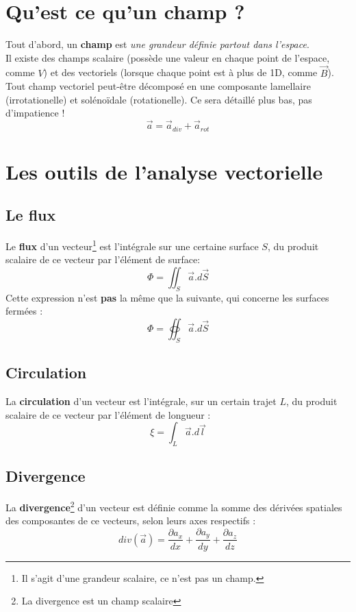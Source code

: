 \documentclass[11pt, a4paper, openany]{book}
\begin{document}
		\section{Qu'est ce qu'un champ ?}
		Tout d'abord, un \textbf{champ} est \textit{une grandeur définie partout dans l'espace}.\\
		Il existe des champs scalaire (possède une valeur en chaque point de l'espace, comme $V$) et des vectoriels (lorsque chaque point est à plus de 1D, comme $\vec{B}$).\\
		Tout champ vectoriel peut-être décomposé en une composante lamellaire (irrotationelle) et solénoïdale (rotationelle). Ce sera détaillé plus bas, pas d'impatience ! 
		\begin{equation}
		\vec{a} = \vec{a}_{div} + \vec{a}_{rot}
		\end{equation}
		
		\section{Les outils de l'analyse vectorielle}
		\subsection{Le flux}
		Le \textbf{flux} d'un vecteur\footnote{Il s'agit d'une grandeur scalaire, ce n'est pas un champ.} est l'intégrale sur une certaine surface $S$, du produit scalaire de ce vecteur par l'élément de surface:
		\begin{equation}
		\Phi = \iint_S \vec{a}.d\vec{S}
		\end{equation}
		Cette expression n'est \textbf{pas} la même que la suivante, qui concerne les surfaces fermées :
		\begin{equation}
		\Phi = \oiint_S \vec{a}.d\vec{S}
		\end{equation}
		
		
		\subsection{Circulation}
		La \textbf{circulation} d'un vecteur est l'intégrale, sur un certain trajet $L$, du produit scalaire de ce vecteur par l'élément de longueur :
		\begin{equation}
		\xi = \int_L \vec{a}.d\vec{l}
		\end{equation}
		
		\subsection{Divergence}
		La \textbf{divergence}\footnote{La divergence est un champ scalaire} d'un vecteur est définie comme la somme des dérivées spatiales des composantes de ce vecteurs, selon leurs axes respectifs :
		\begin{equation}
		div(\vec{a}) = \frac{\partial a_x}{dx} + \frac{\partial a_y}{dy} + \frac{\partial a_z}{dz}
		\end{equation}
		
\end{document}
